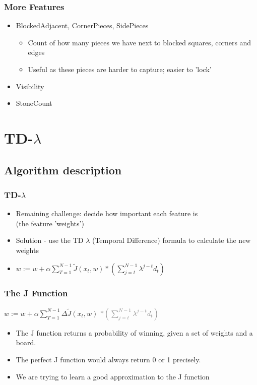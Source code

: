 \documentclass[10pt]{beamer}
\begin{document}
\begin{frame}
  \frametitle{More Features}   %
  \begin{itemize}
  \item<1-> BlockedAdjacent, CornerPieces, SidePieces
  \begin{itemize}
    \item<2-> Count of how many pieces we have next to blocked squares, corners and edges
    \item<2-> Useful as these pieces are harder to capture; easier to 'lock'
  \end{itemize}
  \item<3-> Visibility
  \item<3-> StoneCount
  \end{itemize}
\end{frame}

\section{TD-$\lambda$}
\subsection{Algorithm description}
    \begin{frame}
      \frametitle{TD-$\lambda$}
      \begin{itemize}
        \item<1-> Remaining challenge: decide how important each feature is\\ (the feature 'weights')
        \item<2-> Solution - use the TD $\lambda$ (Temporal Difference) formula to calculate the new weights
        \item<2-> $\displaystyle w := w + \alpha \sum_{T=1}^{N-1} \tilde{J}(x_t,w) *( \sum _{j=t} ^{N-1} \lambda ^{j-t} d_t )$ 
      \end{itemize}
    \end{frame}
    
    \begin{frame}
      \frametitle{The J Function}
      \begin{center} $\displaystyle w := w + \alpha \sum_{T=1}^{N-1} \Delta \tilde{J}(x_t,w)$  \textcolor{gray}{$ * ( \sum _{j=t} ^{N-1} \lambda ^{j-t} d_t )$} \end{center}
      \begin{itemize}
        \item<1-> The J function returns a probability of winning, given a set of weights and a board.
        \item<1-> The perfect J function would always return 0 or 1 precisely.
        \item<1-> We are trying to learn a good approximation to the J function
      \end{itemize}
    \end{frame}
    
\end{document}
